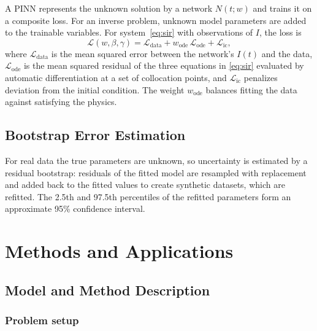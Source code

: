 \documentclass[12pt,a4paper]{article}
\newcommand{\wode}{w_{\mathrm{ode}}}
\begin{document}
A PINN \citep{raissi2019} represents the unknown solution by a network $N(t;w)$ and trains it on a composite loss. For an inverse problem, unknown model parameters are added to the trainable variables. For system~\eqref{eq:sir} with observations of $I$, the loss is
\begin{equation}
  \mathcal{L}(w,\beta,\gamma) = \mathcal{L}_{\mathrm{data}} + \wode\,\mathcal{L}_{\mathrm{ode}} + \mathcal{L}_{\mathrm{ic}},
  \label{eq:pinnloss}
\end{equation}
where $\mathcal{L}_{\mathrm{data}}$ is the mean squared error between the network's $I(t)$ and the data, $\mathcal{L}_{\mathrm{ode}}$ is the mean squared residual of the three equations in \eqref{eq:sir} evaluated by automatic differentiation at a set of collocation points, and $\mathcal{L}_{\mathrm{ic}}$ penalizes deviation from the initial condition. The weight $\wode$ balances fitting the data against satisfying the physics.

\subsection{Bootstrap Error Estimation}

For real data the true parameters are unknown, so uncertainty is estimated by a residual bootstrap: residuals of the fitted model are resampled with replacement and added back to the fitted values to create synthetic datasets, which are refitted. The 2.5th and 97.5th percentiles of the refitted parameters form an approximate 95\% confidence interval.

\section{Methods and Applications}

\subsection{Model and Method Description}

\subsubsection*{Problem setup}
\end{document}
